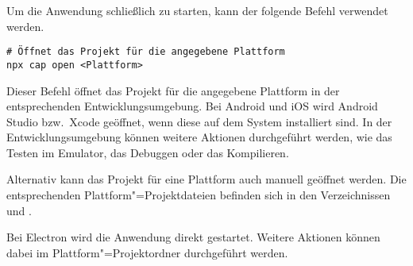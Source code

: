 Um die Anwendung schließlich zu starten, kann der folgende Befehl verwendet werden.

\begin{verbatim}
# Öffnet das Projekt für die angegebene Plattform
npx cap open <Plattform>
\end{verbatim}

Dieser Befehl öffnet das Projekt für die angegebene Plattform in der entsprechenden Entwicklungsumgebung. 
Bei Android und iOS wird Android Studio bzw.\ Xcode geöffnet, wenn diese auf dem System installiert sind.
In der Entwicklungsumgebung können weitere Aktionen durchgeführt werden, wie das Testen im Emulator, das Debuggen oder das Kompilieren.

Alternativ kann das Projekt für eine Plattform auch manuell geöffnet werden. Die entsprechenden Plattform"=Projektdateien befinden sich in den Verzeichnissen  und .

Bei Electron wird die Anwendung direkt gestartet. Weitere Aktionen können dabei im Plattform"=Projektordner  durchgeführt werden.

